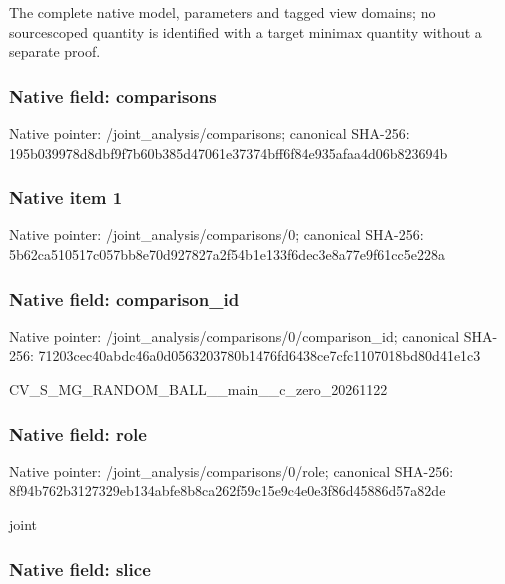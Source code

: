 \documentclass[10pt,a4paper]{article}
\begin{document}
The complete native model, parameters and tagged view domains; no sourcescoped quantity is identified with a target minimax quantity without a separate proof.


\subsubsection{Native field: comparisons}


Native pointer: /joint\_analysis/comparisons; canonical SHA-256: 195b039978d8dbf9f7b60b38\allowbreak{}5d47061e37374bff6f84e935\allowbreak{}afaa4d06b823694b



\subsubsection{Native item 1}


Native pointer: /joint\_analysis/comparisons/0; canonical SHA-256: 5b62ca510517c057bb8e70d9\allowbreak{}27827a2f54b1e133f6dec3e8\allowbreak{}a77e9f61cc5e228a



\subsubsection{Native field: comparison\_id}


Native pointer: /joint\_analysis/comparis\allowbreak{}ons/0/comparison\_id; canonical SHA-256: 71203cec40abdc46a0d05632\allowbreak{}03780b1476fd6438ce7cfc11\allowbreak{}07018bd80d41e1c3


CV\_S\_MG\_RANDOM\_BALL\_\_mai\allowbreak{}n\_\_c\_zero\_20261122


\subsubsection{Native field: role}


Native pointer: /joint\_analysis/comparisons/0/role; canonical SHA-256: 8f94b762b3127329eb134abf\allowbreak{}e8b8ca262f59c15e9c4e0e3f\allowbreak{}86d45886d57a82de


joint


\subsubsection{Native field: slice}
\end{document}
